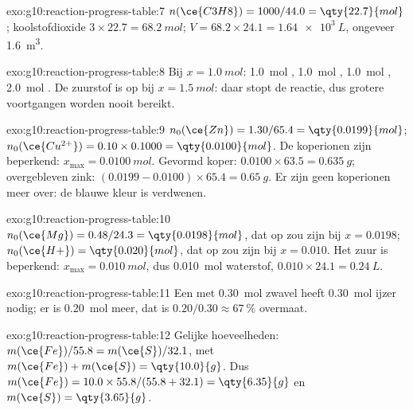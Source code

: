 \begin{solution}{exo:g10:reaction-progress-table:7}
$n(\ce{C3H8}) = 1000 / 44.0 = \qty{22.7}{mol}$; koolstofdioxide
$3 \times 22.7 = \qty{68.2}{mol}$; $V = 68.2 \times 24.1 =
\qty{1.64e3}{L}$, ongeveer \qty{1.6}{m^3}.
\end{solution}

\begin{solution}{exo:g10:reaction-progress-table:8}
Bij $x = \qty{1.0}{mol}$: \qty{1.0}{mol} , \qty{1.0}{mol}
, \qty{1.0}{mol} , \qty{2.0}{mol} . De zuurstof
is op bij $x = \qty{1.5}{mol}$: daar stopt de reactie, dus grotere
voortgangen worden nooit bereikt.
\end{solution}

\begin{solution}{exo:g10:reaction-progress-table:9}
$n_0(\ce{Zn}) = 1.30 / 65.4 = \qty{0.0199}{mol}$;
$n_0(\ce{Cu^{2+}}) = 0.10 \times 0.1000 = \qty{0.0100}{mol}$. De
koperionen zijn beperkend: $x_{\max} = \qty{0.0100}{mol}$. Gevormd koper:
$0.0100 \times 63.5 = \qty{0.635}{g}$; overgebleven zink:
$(0.0199 - 0.0100) \times 65.4 = \qty{0.65}{g}$. Er zijn geen
koperionen meer over: de blauwe kleur is verdwenen.
\end{solution}

\begin{solution}{exo:g10:reaction-progress-table:10}
$n_0(\ce{Mg}) = 0.48 / 24.3 = \qty{0.0198}{mol}$, dat op zou zijn bij
$x = 0.0198$; $n_0(\ce{H+}) = \qty{0.020}{mol}$, dat op zou zijn bij
$x = 0.010$. Het zuur is beperkend: $x_{\max} = \qty{0.010}{mol}$, dus
\qty{0.010}{mol} waterstof, $0.010 \times 24.1 = \qty{0.24}{L}$.
\end{solution}

\begin{solution}{exo:g10:reaction-progress-table:11}
Een  met \qty{0.30}{mol} zwavel heeft
\qty{0.30}{mol} ijzer nodig; er is \qty{0.20}{mol} meer, dat is
$0.20 / 0.30 \approx \qty{67}{\percent}$ overmaat.
\end{solution}

\begin{solution}{exo:g10:reaction-progress-table:12}
Gelijke hoeveelheden: $m(\ce{Fe})/55.8 = m(\ce{S})/32.1$, met
$m(\ce{Fe}) + m(\ce{S}) = \qty{10.0}{g}$. Dus
$m(\ce{Fe}) = 10.0 \times 55.8 / (55.8 + 32.1) = \qty{6.35}{g}$ en
$m(\ce{S}) = \qty{3.65}{g}$.
\end{solution}

